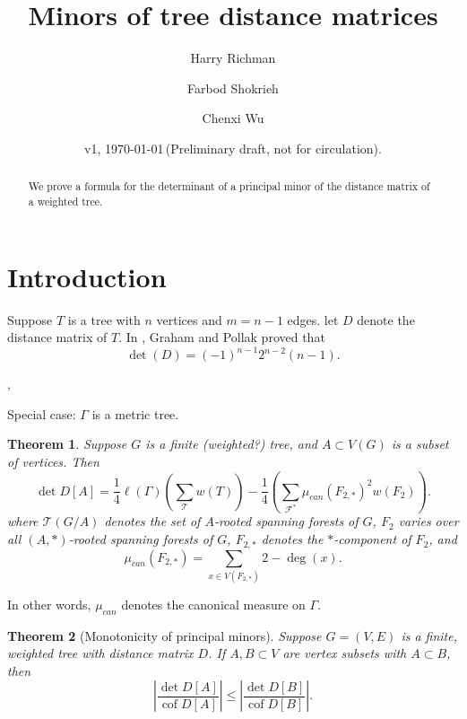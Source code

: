 \documentclass{amsart}
\newtheorem{thm}{Theorem}
\theoremstyle{definition}
\DeclareMathOperator{\cof}{cof}
\begin{document}
\title[Tree distance minors]{Minors of tree distance matrices}
\author{Harry Richman}
\author{Farbod Shokrieh}
\author{Chenxi Wu}
\date{v1, \today  \,(Preliminary draft, not for circulation).}


\begin{abstract}
We prove a formula for the determinant of 
a principal minor of
the distance matrix of a weighted tree.
\end{abstract}
\maketitle

\setcounter{tocdepth}{1}
\tableofcontents

\section{Introduction}

Suppose $T$ is a tree with $n$ vertices and $m=n-1$ edges.
let $D$ denote the distance matrix of $T$.
In
\cite{graham-pollak},
Graham and Pollak proved that
\begin{equation}
\det(D) = (-1)^{n-1} 2^{n-2} (n-1). 
\end{equation}

\cite{graham-hoffman-hosoya}, 

Special case: $\Gamma$ is a metric tree.

\begin{thm}\label{thm:max-capacity}
Suppose $G$ is a finite (weighted?) tree, and $A \subset V(G)$ is a subset of vertices.
Then
\begin{equation}\label{eq:max-capacity}
\det D[A] = \frac14 \ell(\Gamma)\left( \sum_{\mathcal T} w(T) \right) - \frac14 \left( \sum_{\mathcal F^*} \mu_{can}(F_{2,*})^2 w(F_2) \right).
\end{equation}
where 
$\mathcal T(G/A)$ denotes the set of $A$-rooted spanning forests of $G$,
$F_2$ varies over all $(A,*)$-rooted spanning forests of $G$,
$F_{2,*}$ denotes the $*$-component of $F_2$, 
and
\begin{equation}
\mu_{can}(F_{2,*}) 
= \sum_{x \in V( F_{2,*})} {2 - \deg(x)}.
\end{equation}
\end{thm}
In other words, 
$\mu_{can}$ denotes the canonical measure on $\Gamma$.


\begin{thm}[Monotonicity of principal minors]
Suppose $G = (V,E)$ is a finite, weighted tree with distance matrix $D$.
If $A,B \subset V$
are vertex subsets with
$A \subset B$,
then
\begin{equation*}
\left| \frac{\det D[A]}{\cof D[A]} \right| \leq \left| \frac{\det D[B]}{\cof D[B]} \right| .
\end{equation*}
\end{thm}
\end{document}
